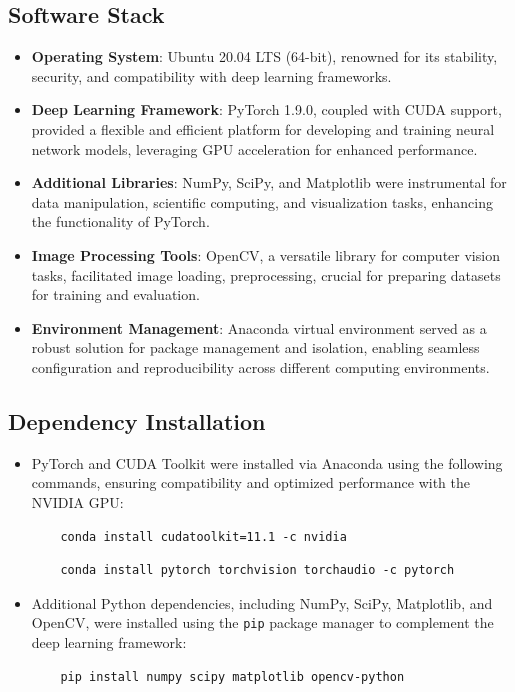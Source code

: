 \subsection{Software Stack}
\begin{itemize}
  \item \textbf{Operating System}: Ubuntu 20.04 LTS (64-bit), renowned for its stability, security, and compatibility with deep learning frameworks.
  \item \textbf{Deep Learning Framework}: PyTorch 1.9.0, coupled with CUDA support, provided a flexible and efficient platform for developing and training neural network models, leveraging GPU acceleration for enhanced performance.
  \item \textbf{Additional Libraries}: NumPy, SciPy, and Matplotlib were instrumental for data manipulation, scientific computing, and visualization tasks, enhancing the functionality of PyTorch.
  \item \textbf{Image Processing Tools}: OpenCV, a versatile library for computer vision tasks, facilitated image loading, preprocessing, crucial for preparing datasets for training and evaluation.
  \item \textbf{Environment Management}: Anaconda virtual environment served as a robust solution for package management and isolation, enabling seamless configuration and reproducibility across different computing environments.
\end{itemize}

\subsection{Dependency Installation}
\begin{itemize}
  \item PyTorch and CUDA Toolkit were installed via Anaconda using the following commands, ensuring compatibility and optimized performance with the NVIDIA GPU:
    \begin{verbatim}
    conda install cudatoolkit=11.1 -c nvidia
    \end{verbatim}
    \begin{verbatim}
    conda install pytorch torchvision torchaudio -c pytorch
    \end{verbatim}


  \item Additional Python dependencies, including NumPy, SciPy, Matplotlib, and OpenCV, were installed using the \texttt{pip} package manager to complement the deep learning framework:
    \begin{verbatim}
    pip install numpy scipy matplotlib opencv-python
    \end{verbatim}
\end{itemize}

